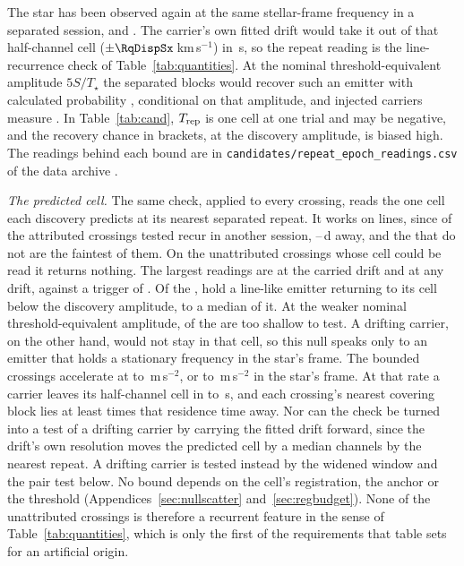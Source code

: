 The star has been observed again at the same stellar-frame frequency in a
separated session, and \RcSxSepClause. The carrier's own fitted drift would
take it out of that half-channel cell ($\pm\RqDispSx$\,km\,s$^{-1}$) in
\ZtSxLeaveSec\,s, so the repeat reading is the line-recurrence check of
Table~\ref{tab:quantities}. At the nominal threshold-equivalent amplitude
$5S/T_\star$ the separated blocks would recover such an emitter with
calculated probability \RcSxPowerTrig, conditional on that amplitude, and
injected carriers measure \HjMeasSx. In Table~\ref{tab:cand}, $T_{\rm rep}$ is one cell
at one trial and may be negative, and the recovery chance in brackets, at the
discovery amplitude, is biased high. The readings behind each bound are in
\texttt{candidates/repeat\_epoch\_readings.csv} of the data archive
\citep{SIdeposit}.

\emph{The predicted cell.} The same check, applied to every crossing, reads
the one cell each discovery predicts at its nearest separated repeat. It
works on lines, since \MkAttrRecur{} of the \MkAttrTested{} attributed
crossings tested recur in another session, \QcSepMinD--\QcSepMaxD\,d away, and the
\MkAttrExcl{} that do not are the faintest of them. On the \RcNExclPoss{}
unattributed crossings whose cell could be read it returns nothing. The
largest readings are \RcTMatched{} at the carried drift and \RcTMax{} at any
drift, against a trigger of \StageNullTrig. Of the \RcNExcl, \RcNFracBelow{} hold a line-like emitter returning to its
cell below the discovery amplitude, to a median \RcFracMed{} of it. At the
weaker nominal threshold-equivalent amplitude, \HjNPowerLo{} of the
\RcNExcl{} are too shallow to test. A drifting
carrier, on the other hand, would not stay in that cell, so this null speaks
only to an emitter that holds a stationary frequency in the star's frame. The
bounded crossings
accelerate at \ZtALosLo{} to \ZtALosHi\,m\,s$^{-2}$, or \EgExStarALosLo{} to
\EgStarALosHi\,m\,s$^{-2}$ in the star's frame. At that rate a carrier leaves its
half-channel cell in \ZtLeaveSecLo{} to \ZtLeaveSecHi\,s, and each
crossing's nearest covering block lies at least \ZtGapOverLeaveMin{} times
that residence time away. Nor can the check be turned into a test of a
drifting carrier by carrying the fitted drift forward, since the drift's own
resolution moves the predicted cell by a median \ZtRegChanMed{} channels by
the nearest repeat. A drifting carrier is tested instead by the widened
window and the pair test below. No bound depends on the
cell's registration, the anchor or the threshold
(Appendices~\ref{sec:nullscatter} and~\ref{sec:regbudget}).\RcNoRepeatSentence{} None of the unattributed crossings is therefore a recurrent
feature in the sense of Table~\ref{tab:quantities}, which is only the first
of the requirements that table sets for an artificial origin.

